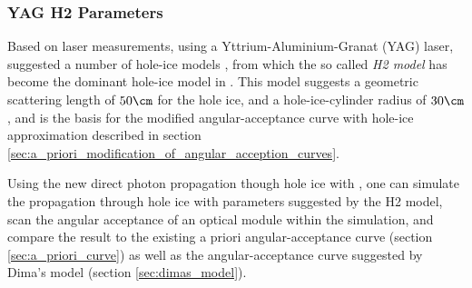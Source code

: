 %
%
%
%
%
%
\subsubsection{YAG H2 Parameters}
\label{sec:yag_h2_parameters}
Based on laser measurements, using a Yttrium-Aluminium-Granat (YAG) laser,  suggested a number of hole-ice models \cite{holeicestudieswithyag}, from which the so called \textit{H2 model} has become the dominant hole-ice model in \icecube. This model suggests a geometric scattering length of $50\cm$ for the hole ice, and a hole-ice-cylinder radius of $30\cm$, and is the basis for the modified angular-acceptance curve with hole-ice approximation described in section \ref{sec:a_priori_modification_of_angular_acception_curves}.

Using the new direct photon propagation though hole ice with \clsim, one can simulate the propagation through hole ice with parameters suggested by the H2 model, scan the angular acceptance of an optical module within the simulation, and compare the result to the existing a priori angular-acceptance curve (section \ref{sec:a_priori_curve}) as well as the angular-acceptance curve suggested by Dima's model (section \ref{sec:dimas_model}).

